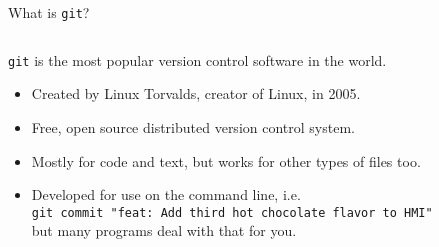\documentclass[
8pt,
]{beamer}
\begin{document}
\begin{frame}{What is \texttt{git}?}
  \vspace*{\baselineskip}
  \begin{columns}
    \begin{column}{0.75\linewidth}
      \texttt{git} is the most popular version control software in the world.
      \begin{itemize}
        \item Created by Linux Torvalds, creator of Linux, in 2005.
        \item Free, open source distributed version control system.
        \item Mostly for code and text, but works for other types of files too.
        \item Developed for use on the command line, i.e. \\ \texttt{\small git commit "feat: Add third hot chocolate flavor to HMI"} \\ but many programs deal with that for you.
      \end{itemize}
    \end{column}
    \begin{column}{0.25\linewidth}
    \end{column}
  \end{columns}
\end{frame}
\end{document}

